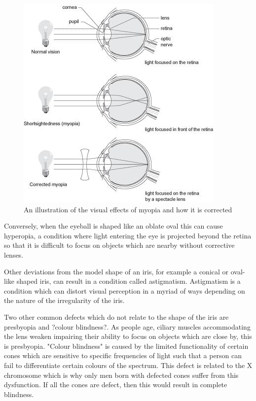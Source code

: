 \begin{figure}[htbp]
\centering
\includegraphics{figures/myopia}
\caption{An illustration of the visual effects of myopia and how it is corrected}
\label{fig:myop}
\end{figure}

Conversely, when the eyeball is shaped like an oblate oval this can cause
hyperopia, a condition where light entering the eye is projected beyond the
retina so that it is difficult to focus on objects which are nearby without
corrective lenses.

Other deviations from the model shape of an iris, for example a conical
or oval-like shaped iris, can result in a condition called astigmatism.
Astigmatism is a condition which can distort visual perception in a myriad
of ways depending on the nature of the irregularity of the iris.

Two other common defects which do not relate to the shape of the iris are
presbyopia and ?colour blindness?. As people age, ciliary muscles
accommodating the  lens weaken impairing their ability to focus on objects
which are close by, this is presbyopia. \cite{fisher1985ciliary} "Colour
blindness" is caused by the limited functionality of certain cones which are
sensitive to specific frequencies of light such that a person can fail to
differentiate certain colours of the spectrum. This defect is related to the X
chromosome which is why only men born with defected cones suffer from
this dysfunction.\cite{george1996clinical} If all the cones are defect, then
this would result in complete blindness.

